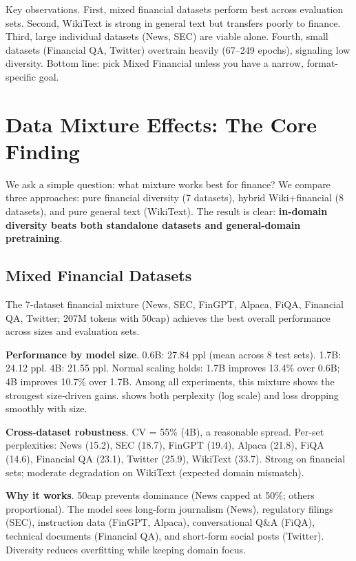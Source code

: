 Key observations. First, mixed financial datasets perform best across evaluation sets. Second, WikiText is strong in general text but transfers poorly to finance. Third, large individual datasets (News, SEC) are viable alone. Fourth, small datasets (Financial QA, Twitter) overtrain heavily (67--249 epochs), signaling low diversity. Bottom line: pick Mixed Financial unless you have a narrow, format-specific goal.

\section{Data Mixture Effects: The Core Finding}

We ask a simple question: what mixture works best for finance? We compare three approaches: pure financial diversity (7 datasets), hybrid Wiki+financial (8 datasets), and pure general text (WikiText). The result is clear: \textbf{in-domain diversity beats both standalone datasets and general-domain pretraining}.

\subsection{Mixed Financial Datasets}

The 7-dataset financial mixture (News, SEC, FinGPT, Alpaca, FiQA, Financial QA, Twitter; 207M tokens with 50cap) achieves the best overall performance across sizes and evaluation sets.

\textbf{Performance by model size}. 0.6B: 27.84 ppl (mean across 8 test sets). 1.7B: 24.12 ppl. 4B: 21.55 ppl. Normal scaling holds: 1.7B improves 13.4\% over 0.6B; 4B improves 10.7\% over 1.7B. Among all experiments, this mixture shows the strongest size‑driven gains.  shows both perplexity (log scale) and loss dropping smoothly with size.

\textbf{Cross‑dataset robustness}. CV = 55\% (4B), a reasonable spread. Per‑set perplexities: News (15.2), SEC (18.7), FinGPT (19.4), Alpaca (21.8), FiQA (14.6), Financial QA (23.1), Twitter (25.9), WikiText (33.7). Strong on financial sets; moderate degradation on WikiText (expected domain mismatch).

\textbf{Why it works}. 50cap prevents dominance (News capped at 50\%; others proportional). The model sees long‑form journalism (News), regulatory filings (SEC), instruction data (FinGPT, Alpaca), conversational Q\&A (FiQA), technical documents (Financial QA), and short‑form social posts (Twitter). Diversity reduces overfitting while keeping domain focus.

